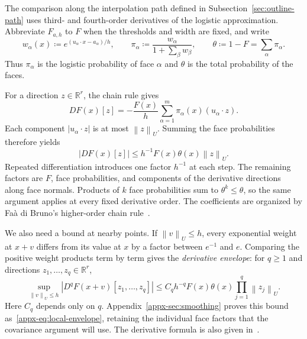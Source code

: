 \documentclass[11pt,letterpaper]{article}
\theoremstyle{remark}
\newcommand{\R}{\mathbb R}
\newcommand{\norm}[1]{\left\lVert#1\right\rVert}
\begin{document}
The comparison along the interpolation path defined in
Subsection~\ref{sec:outline-path} uses third- and fourth-order
derivatives of the logistic approximation. Abbreviate \(F_{a,h}\) to
\(F\) when the thresholds and width are fixed, and write
\[
 w_\alpha(x)\coloneqq e^{(u_\alpha\cdot x-a_\alpha)/h},\qquad
 \pi_\alpha\coloneqq\frac{w_\alpha}{1+\sum_\beta w_\beta},\qquad
 \theta\coloneqq1-F=\sum_\alpha\pi_\alpha.
\]
Thus \(\pi_\alpha\) is the logistic probability of face \(\alpha\)
and \(\theta\) is the total probability of the faces.

For a direction \(z\in\R^r\), the chain rule gives
\[
 DF(x)[z]= -\frac{F(x)}h
           \sum_{\alpha=1}^m\pi_\alpha(x)(u_\alpha\cdot z).
\]
Each component \(|u_\alpha\cdot z|\) is at most \(\norm z_U\).
Summing the face probabilities therefore yields
\[
 |DF(x)[z]|\le h^{-1}F(x)\theta(x)\norm z_U.
\]
Repeated differentiation introduces one factor \(h^{-1}\) at each
step. The remaining factors are \(F\), face probabilities, and
components of the derivative directions along face normals. Products
of \(k\) face probabilities sum to \(\theta^k\le\theta\), so
the same argument applies at every fixed derivative order. The
coefficients are organized by Fa\`a di Bruno's higher-order chain
rule~\cite{Comtet1974}.

We also need a bound at nearby points. If \(\norm v_U\le h\),
every exponential weight at \(x+v\) differs from its value at
\(x\) by a factor between \(e^{-1}\) and \(e\). Comparing the
positive weight products term by term gives the \emph{derivative
envelope}: for \(q\ge1\) and directions \(z_1,\ldots,z_q\in\R^r\),
\[
 \sup_{\norm v_U\le h}|D^qF(x+v)[z_1,\ldots,z_q]|
 \le C_qh^{-q}F(x)\theta(x)\prod_{j=1}^q\norm{z_j}_U.
\]
Here \(C_q\) depends only on \(q\). Appendix~\ref{appx-sec:smoothing}
proves this bound as~\eqref{appx-eq:local-envelope}, retaining the
individual face factors that the covariance argument will use.
The derivative formula is also given in~\cite[Lemma~13]{GaoZhang}.
\end{document}
